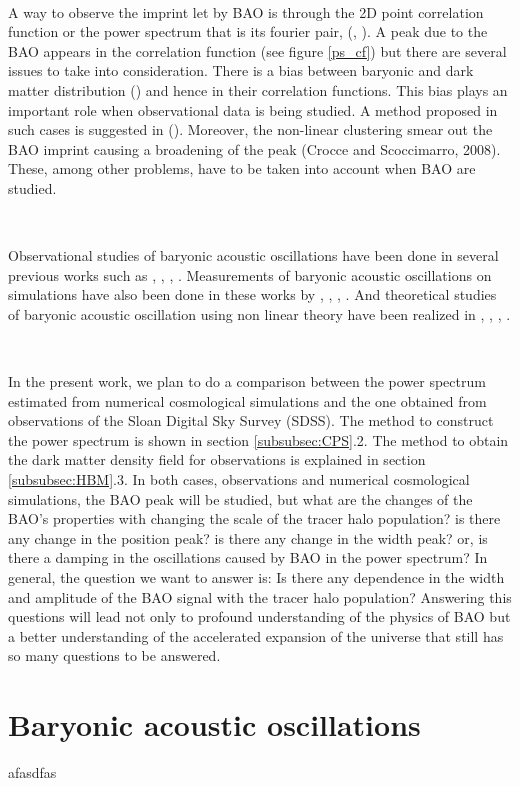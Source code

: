 \	

A way to observe the imprint let by BAO is through the 2D point correlation function or the power spectrum that is 
its fourier pair, (\cite{PLOT}, \cite{PLOT2}).  A peak due to the BAO appears in the correlation function (see figure \ref{ps_cf}) but there are 
several issues to take into consideration.
There is a bias between baryonic and dark matter distribution (\cite{Biases}) and hence in their correlation functions. This bias  
plays an important role when observational data 
is being studied. A method proposed in such cases is suggested in (\cite{HBM}). 
Moreover, the non-linear clustering smear out the BAO imprint causing a broadening of the peak (Crocce
and Scoccimarro, 2008). These, among other 
problems, have to be taken into account when BAO are studied. 

\

Observational studies of baryonic acoustic oscillations have been done in several previous works such 
as \cite{Obs01}, \cite{Obs02}, \cite{Obs03}, \cite{Obs04} . Measurements of baryonic acoustic oscillations on simulations 
have also been done in these works by \cite{Sim01}, \cite{Sim02}, \cite{Sim03}, \cite{Sim04}.
And theoretical studies of baryonic acoustic oscillation using non linear theory have been realized in \cite{Theo01}, \cite{Theo02},
\cite{Theo03}, \cite{last} .  

\

In the present work, we plan to do a comparison between the power spectrum estimated from numerical cosmological simulations
and the one obtained from observations of the Sloan Digital Sky Survey (SDSS). The method to construct the power spectrum
is shown in section \ref{subsubsec:CPS}.2. The method to obtain the dark matter density field for observations is 
explained in section \ref{subsubsec:HBM}.3. In both cases, observations and numerical cosmological simulations, the BAO 
peak will be studied, but what are the changes of the BAO's properties with changing the scale of the tracer halo population?
is there any change in the position peak? is there any change in the width peak? or, is there a damping in the oscillations
caused by BAO in the power spectrum? In general, the question we want to answer is: Is there any dependence in the width 
and amplitude of the BAO signal with the tracer halo population?
Answering this questions will lead not only to profound understanding of the physics of
BAO but a better understanding of the accelerated expansion of the universe that still has so many questions to be answered. 


\section{ Baryonic acoustic oscillations } 

afasdfas

